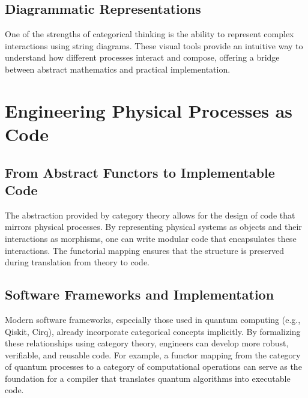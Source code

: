 \documentclass[11pt]{article}
\begin{document}
\subsection{Diagrammatic Representations}
One of the strengths of categorical thinking is the ability to represent complex interactions using string diagrams. These visual tools provide an intuitive way to understand how different processes interact and compose, offering a bridge between abstract mathematics and practical implementation.

\section{Engineering Physical Processes as Code}
\subsection{From Abstract Functors to Implementable Code}
The abstraction provided by category theory allows for the design of code that mirrors physical processes. By representing physical systems as objects and their interactions as morphisms, one can write modular code that encapsulates these interactions. The functorial mapping ensures that the structure is preserved during translation from theory to code.

\subsection{Software Frameworks and Implementation}
Modern software frameworks, especially those used in quantum computing (e.g., Qiskit, Cirq), already incorporate categorical concepts implicitly. By formalizing these relationships using category theory, engineers can develop more robust, verifiable, and reusable code. For example, a functor mapping from the category of quantum processes to a category of computational operations can serve as the foundation for a compiler that translates quantum algorithms into executable code.
\end{document}

